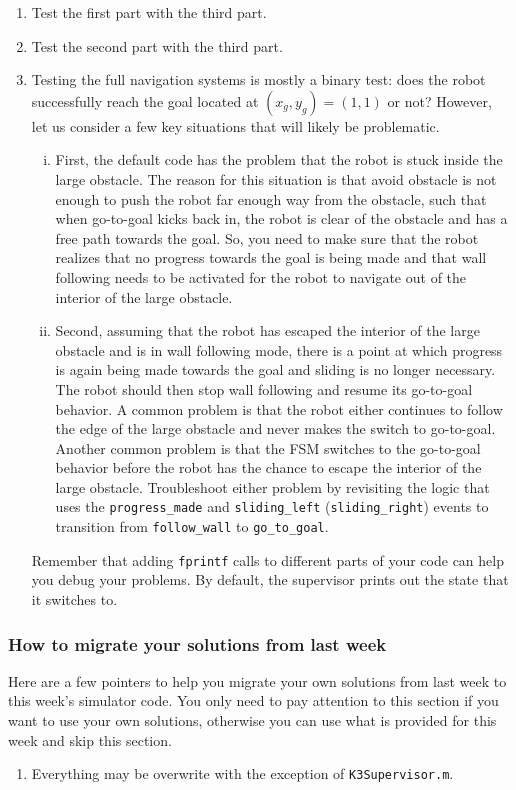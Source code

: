 \documentclass[10pt]{article}
\begin{document}
\begin{enumerate}
  \item Test the first part with the third part.
  \item Test the second part with the third part.
  \item Testing the full navigation systems is mostly a binary test: does the robot successfully reach the goal located at $(x_g,y_g)=(1,1)$ or not? However, let us consider a few key situations that will likely be problematic.
  \begin{enumerate}[(i)]
    \item First, the default code has the problem that the robot is stuck inside the large obstacle. The reason for this situation is that avoid obstacle is not enough to push the robot far enough way from the obstacle, such that when go-to-goal kicks back in, the robot is clear of the obstacle and has a free path towards the goal. So, you need to make sure that the robot realizes that no progress towards the goal is being made and that wall following needs to be activated for the robot to navigate out of the interior of the large obstacle.
    \item Second, assuming that the robot has escaped the interior of the large obstacle and is in wall following mode, there is a point at which progress is again being made towards the goal and sliding is no longer necessary. The robot should then stop wall following and resume its go-to-goal behavior. A common problem is that the robot either continues to follow the edge of the large obstacle and never makes the switch to go-to-goal. Another common problem is that the FSM switches to the go-to-goal behavior before the robot has the chance to escape the interior of the large obstacle. Troubleshoot either problem by revisiting the logic that uses the \texttt{progress\_made} and \texttt{sliding\_left} (\texttt{sliding\_right}) events to transition from \texttt{follow\_wall} to \texttt{go\_to\_goal}.
  \end{enumerate}
  Remember that adding \texttt{fprintf} calls to different parts of your code can help you debug your problems. By default, the supervisor prints out the state that it switches to.
\end{enumerate}

\subsubsection*{How to migrate your solutions from last week}
Here are a few pointers to help you migrate your own solutions from last week to this week's simulator code. You only need to pay attention to this section if you want to use your own solutions, otherwise you can use what is provided for this week and skip this section.

\begin{enumerate}
 \item Everything may be overwrite with the exception of \texttt{K3Supervisor.m}.
\end{enumerate}
\end{document}
